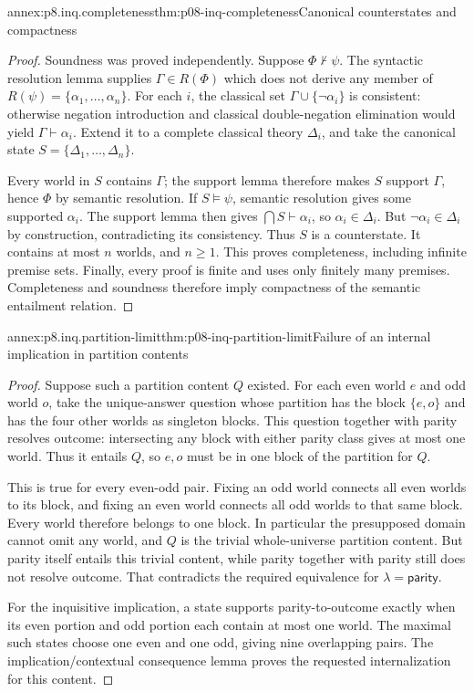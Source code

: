 \begin{annexitem}{annex:p8.inq.completeness}{thm:p08-inq-completeness}{Canonical counterstates and compactness}
\begin{proof}
Soundness was proved independently. Suppose \(\Phi\not\vdash\psi\).
The syntactic resolution lemma supplies \(\Gamma\in R(\Phi)\) which
does not derive any member of \(R(\psi)=\{\alpha_1,\ldots,\alpha_n\}\).
For each \(i\), the classical set \(\Gamma\cup\{\neg\alpha_i\}\)
is consistent: otherwise negation introduction and classical
double-negation elimination would yield \(\Gamma\vdash\alpha_i\).
Extend it to a complete classical theory \(\Delta_i\), and take the
canonical state \(S=\{\Delta_1,\ldots,\Delta_n\}\).

Every world in \(S\) contains \(\Gamma\); the support lemma therefore
makes \(S\) support \(\Gamma\), hence \(\Phi\) by semantic resolution.
If \(S\models\psi\), semantic resolution gives some supported
\(\alpha_i\). The support lemma then gives
\(\bigcap S\vdash\alpha_i\), so \(\alpha_i\in\Delta_i\).
But \(\neg\alpha_i\in\Delta_i\) by construction, contradicting its
consistency. Thus \(S\) is a counterstate. It contains at most \(n\)
worlds, and \(n\geq1\). This proves completeness, including infinite
premise sets. Finally, every proof is finite and uses only finitely many
premises. Completeness and soundness therefore imply compactness of
the semantic entailment relation.
\end{proof}
\end{annexitem}

\begin{annexitem}{annex:p8.inq.partition-limit}{thm:p08-inq-partition-limit}{Failure of an internal implication in partition contents}
\begin{proof}
Suppose such a partition content \(Q\) existed. For each even world
\(e\) and odd world \(o\), take the unique-answer question whose
partition has the block \(\{e,o\}\) and has the four other worlds
as singleton blocks. This question together with parity resolves
outcome: intersecting any block with either parity class gives at
most one world. Thus it entails \(Q\), so \(e,o\) must be in one
block of the partition for \(Q\).

This is true for every even-odd pair. Fixing an odd world connects
all even worlds to its block, and fixing an even world connects all
odd worlds to that same block. Every world therefore belongs to
one block. In particular the presupposed domain cannot omit any
world, and \(Q\) is the trivial whole-universe partition content.
But parity itself entails this trivial content, while parity
together with parity still does not resolve outcome. That contradicts
the required equivalence for \(\lambda=\mathsf{parity}\).

For the inquisitive implication, a state supports parity-to-outcome
exactly when its even portion and odd portion each contain at most
one world. The maximal such states choose one even and one odd,
giving nine overlapping pairs. The implication/contextual consequence
lemma proves the requested internalization for this content.
\end{proof}
\end{annexitem}

